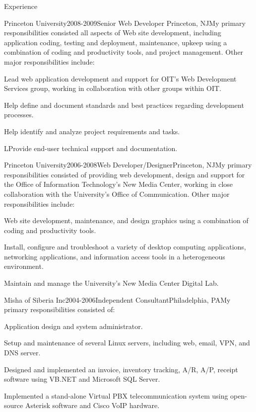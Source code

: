 \documentclass[12pt]{resume}
\begin{document}
\begin{rSection}{Experience}

\begin{rSubsection}{Princeton University}{2008-2009}{Senior Web Developer }{Princeton, NJ}{My primary responsibilities consisted all aspects of Web site development, including application coding, testing and deployment, maintenance, upkeep using a combination of coding and productivity tools, and project management. Other major responsibilities include: }
\item Lead web application development and support for OIT's Web Development Services group, working in collaboration with other groups within OIT.
\item Help define and document standards and best practices regarding development processes.
\item Help identify and analyze project requirements and tasks.
\item LProvide end-user technical support and documentation.
\end{rSubsection}


\begin{rSubsection}{Princeton University}{2006-2008}{Web Developer/Designer}{Princeton, NJ}{My primary responsibilities consisted of providing web development, design and support for the Office of Information Technology's New Media Center, working in close collaboration with the University's Office of Communication. Other major responsibilities include:}
\item Web site development, maintenance, and design graphics using a combination of coding and productivity tools.
\item Install, configure and troubleshoot a variety of desktop computing applications, networking applications, and information access tools in a heterogeneous environment.
\item Maintain and manage the University's New Media Center Digital Lab.
\end{rSubsection}


\begin{rSubsection}{Misha of Siberia Inc}{2004-2006}{Independent Consultant}{Philadelphia, PA}{My primary responsibilities consisted of:}
\item Application design and system administrator.
\item Setup and maintenance of several Linux servers, including web, email, VPN, and DNS server.
\item Designed and implemented an invoice, inventory tracking, A/R, A/P, receipt software using VB.NET and Microsoft SQL Server.
\item Implemented a stand-alone Virtual PBX telecommunication system using open-source Asterisk software and Cisco VoIP hardware.
\end{rSubsection}


\end{rSection}
\end{document}
